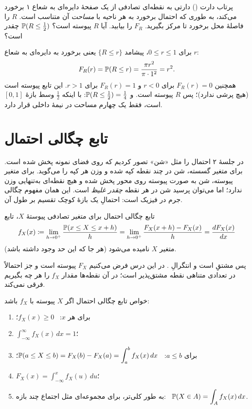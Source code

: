 \begin{example}[label=ex:dart]{پرتاب دارت ()}
دارتی به نقطه‌ای تصادفی از یک صفحهٔ دایره‌ای به شعاع ۱ برخورد می‌کند، به طوری که احتمال برخورد به هر ناحیه با \emph{مساحت} آن متناسب است. $R$ را فاصلهٔ محل برخورد تا مرکز بگیرید. $F_R$ را بیابید. آیا $R$ پیوسته است؟ $\P(R\le\tfrac12)$ چقدر است؟
\begin{solution}
برای $0\le r\le1$، پیشامد $\{R\le r\}$ یعنی برخورد به دایره‌ای به شعاع $r$:
\[ F_R(r)=\P(R\le r)=\frac{\pi r^2}{\pi\cdot1^2}=r^2. \]
همچنین $F_R(r)=0$ برای $r<0$ و $F_R(r)=1$ برای $r>1$. این تابع پیوسته است (هیچ پرشی ندارد)؛ پس $R$ پیوسته است. و $\P(R\le\tfrac12)=\tfrac14$: با اینکه $\tfrac12$ وسط بازهٔ $[0,1]$ است، فقط یک چهارم مساحت در نیمهٔ داخلی قرار دارد.
\end{solution}
\end{example}

\section{تابع چگالی احتمال}
\label{sec:pdf}

در جلسهٔ ۲ احتمال را مثل «شن» تصور کردیم که روی فضای نمونه پخش شده است. برای متغیر گسسته، شن در چند نقطه کپه شده و  وزن هر کپه را می‌گوید. برای متغیر پیوسته، شن به صورت پیوسته روی محور پخش شده و هیچ نقطه‌ای به‌تنهایی وزن ندارد؛ اما می‌توان پرسید شن در هر نقطه \emph{چقدر غلیظ} است. این همان مفهوم چگالی جرم در فیزیک است: احتمالِ یک بازهٔ کوچک تقسیم بر طول آن.

\begin{definition}[label=def:pdf]{تابع چگالی احتمال}
برای متغیر تصادفی پیوستهٔ $X$، تابع
\[ f_X(x)\defeq\lim_{h\to0^+}\frac{\P(x\le X\le x+h)}{h}=\lim_{h\to0^+}\frac{F_X(x+h)-F_X(x)}{h}=\frac{dF_X(x)}{dx} \]
(هر جا که این حد وجود داشته باشد)  متغیر $X$ نامیده می‌شود.
\end{definition}

پس  مشتقِ  است و  انتگرالِ . در این درس فرض می‌کنیم $F_X$ پیوسته است و جز احتمالاً در تعدادی متناهی نقطه مشتق‌پذیر است؛ در آن نقطه‌ها مقدار $f_X$ را هر چه بگیریم فرقی نمی‌کند.

\begin{theorem}[label=thm:pdf-props]{خواص تابع چگالی احتمال}
اگر $X$ پیوسته با  $f_X$ باشد:
\begin{enumerate}
  \item برای هر $x$: \ $f_X(x)\ge0$؛
  \item $\displaystyle\int_{-\infty}^{\infty}f_X(x)\,dx=1$؛
  \item برای $a\le b$: \ $\displaystyle\P(a\le X\le b)=F_X(b)-F_X(a)=\int_a^bf_X(x)\,dx$؛
  \item $\displaystyle F_X(x)=\int_{-\infty}^{x}f_X(u)\,du$؛
  \item به طور کلی‌تر، برای مجموعه‌ای مثل اجتماع چند بازه: \ $\displaystyle\P(X\in A)=\int_Af_X(x)\,dx$.
\end{enumerate}
\end{theorem}

